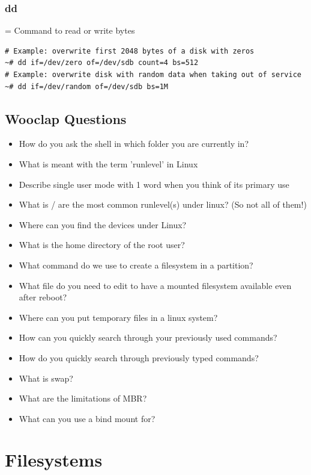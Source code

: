 \documentclass{article}
\begin{document}
\subsubsection{dd}

= Command to read or write bytes

\begin{verbatim}
# Example: overwrite first 2048 bytes of a disk with zeros
~# dd if=/dev/zero of=/dev/sdb count=4 bs=512
# Example: overwrite disk with random data when taking out of service
~# dd if=/dev/random of=/dev/sdb bs=1M
\end{verbatim}

\subsection{Wooclap Questions}

\begin{itemize}
    \item How do you ask the shell in which folder you are currently in?
    \item What is meant with the term 'runlevel' in Linux
    \item Describe single user mode with 1 word when you think of its primary use
    \item What is / are the most common runlevel(s) under linux? (So not all of them!)
    \item Where can you find the devices under Linux?
    \item What is the home directory of the root user?
    \item What command do we use to create a filesystem in a partition?
    \item What file do you need to edit to have a mounted filesystem available even after reboot?
    \item Where can you put temporary files in a linux system?
    \item How can you quickly search through your previously used commands?
    \item How do you quickly search through previously typed commands?
    \item What is swap?
    \item What are the limitations of MBR?
    \item What can you use a bind mount for?
\end{itemize}

\section{Filesystems}
\end{document}
